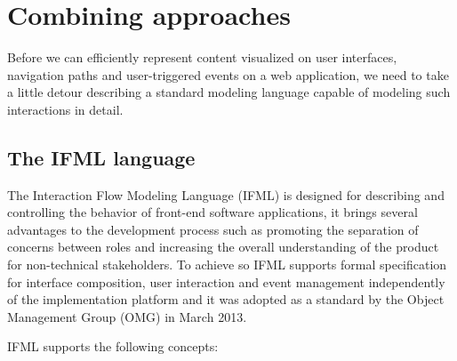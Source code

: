 \chead{}
\chapter{Combining approaches}

Before we can efficiently represent content visualized on user interfaces, navigation paths and user-triggered events on a web application, we need to take a little detour describing a standard modeling language capable of modeling such interactions in detail.

\section{The IFML language}

The Interaction Flow Modeling Language (IFML)\cite{IFML-1, IFML-2} is designed for describing and controlling the behavior of front-end software applications, it brings several advantages to the development process such as promoting the separation of concerns between roles and increasing the overall understanding of the product for non-technical stakeholders. To achieve so IFML supports formal specification for interface composition, user interaction and event management independently of the implementation platform and it was adopted as a standard by the Object Management Group (OMG) in March 2013.

IFML supports the following concepts: 

